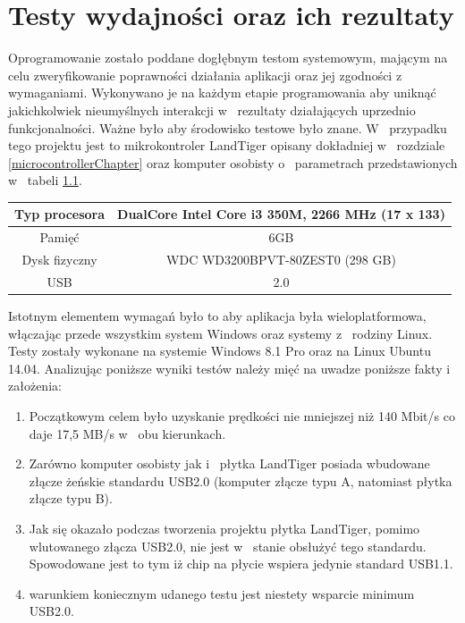 \documentclass{BscUS}
\begin{document}
\chapter{Testy wydajności oraz ich rezultaty}
\label{resultsChapter}
\indent Oprogramowanie zostało poddane dogłębnym testom systemowym, mającym na celu zweryfikowanie poprawności działania aplikacji oraz jej zgodności z~ wymaganiami. Wykonywano je na każdym etapie programowania aby uniknąć jakichkolwiek nieumyślnych interakcji w~ rezultaty działających uprzednio funkcjonalności. Ważne było aby środowisko testowe było znane. W~ przypadku tego projektu jest to mikrokontroler LandTiger opisany dokładniej w~ rozdziale \ref{microcontrollerChapter} oraz komputer osobisty o~ parametrach przedstawionych w~ tabeli \ref{tbl:pcParameters}.
\begin{table}[H]
\centering
\begin{tabular}{|c|c|}
\hline
	\rowcolor[gray]{0.8}
	Typ procesora & DualCore Intel Core i3 350M, 2266 MHz (17 x 133) \\ \hline
	
	Pamięć & 6GB \\ \hline
	 \rowcolor[gray]{0.8}
	 Dysk fizyczny & WDC WD3200BPVT-80ZEST0  (298 GB) \\ \hline
	USB & 2.0 \\ \hline
\end{tabular}
\label{tbl:pcParameters}
\end{table}
\noindent Istotnym elementem wymagań było to aby aplikacja była wieloplatformowa, włączając przede wszystkim system Windows oraz systemy z~ rodziny Linux. Testy zostały wykonane na systemie Windows 8.1 Pro oraz na Linux Ubuntu 14.04.
\noindent Analizując poniższe wyniki testów należy mięć na uwadze poniższe fakty i~ założenia:
\begin{enumerate}
\item Początkowym celem było uzyskanie prędkości nie mniejszej niż 140 Mbit/s co daje 17,5 MB/s w~ obu kierunkach.
\item Zarówno komputer osobisty jak i~ płytka LandTiger posiada wbudowane złącze żeńskie standardu USB2.0 (komputer złącze typu A, natomiast płytka złącze typu B).
\item Jak się okazało podczas tworzenia projektu płytka LandTiger, pomimo wlutowanego złącza USB2.0, nie jest w~ stanie obsłużyć tego standardu. Spowodowane jest to tym iż chip na płycie wspiera jedynie standard USB1.1.
\item warunkiem koniecznym udanego testu jest niestety wsparcie minimum USB2.0.
\end{enumerate}
\end{document}
